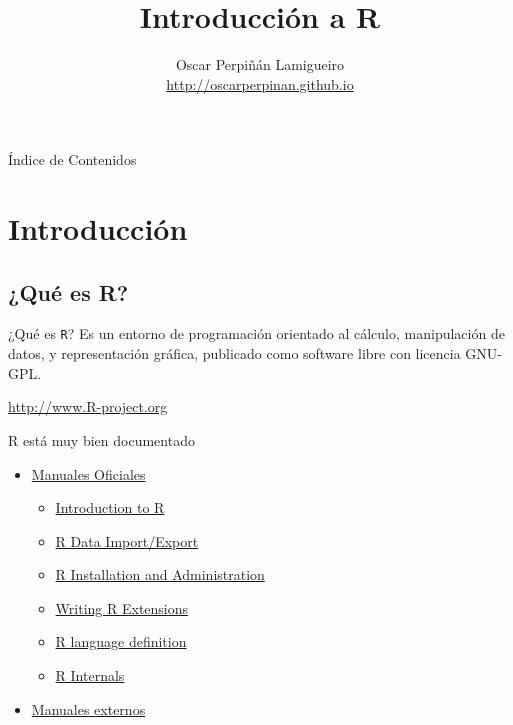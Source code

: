 \documentclass[xcolor={usenames,svgnames,dvipsnames}]{beamer}
\author{Oscar Perpiñán Lamigueiro \\ \url{http://oscarperpinan.github.io}}
\date{}
\title{Introducción a R}
\begin{document}
\maketitle

\begin{frame}[label={sec:org2359ca2}]{Índice de Contenidos}
\setcounter{tocdepth}{1}
\tableofcontents
\end{frame}

\section{Introducción}
\label{sec:org2ad25a2}

\subsection{¿Qué es R?}
\label{sec:org7efef81}
\begin{frame}[fragile,label={sec:orgf84090c}]{¿Qué es \texttt{R}?}
 Es un entorno de programación orientado al cálculo, manipulación de datos, y representación gráfica, publicado como software libre con licencia GNU-GPL.
\begin{center}
\url{http://www.R-project.org} 
\end{center}
\end{frame}

\begin{frame}[label={sec:orgd9eefb3}]{R está muy bien documentado}
\begin{itemize}
\item \href{http://cran.r-project.org/manuals.html}{Manuales Oficiales}

\begin{itemize}
\item \href{http://cran.r-project.org/doc/manuals/r-release/R-intro.html}{Introduction to R}

\item \href{http://cran.r-project.org/doc/manuals/r-release/R-data.html}{R Data Import/Export}

\item \href{http://cran.r-project.org/doc/manuals/r-release/R-admin.html}{R Installation and Administration}

\item \href{http://cran.r-project.org/doc/manuals/r-release/R-exts.html}{Writing R Extensions}

\item \href{http://cran.r-project.org/doc/manuals/r-release/R-lang.html}{R language definition}

\item \href{http://cran.r-project.org/doc/manuals/r-release/R-ints.html}{R Internals}
\end{itemize}

\item \href{http://cran.r-project.org/other-docs.html}{Manuales externos}
\end{itemize}
\end{frame}
\end{document}
